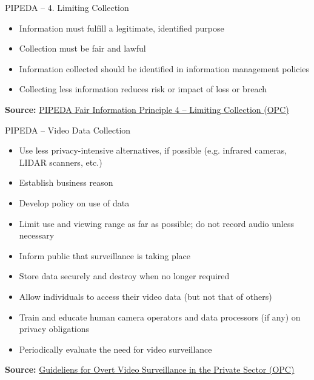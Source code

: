 \documentclass[ignorenonframetext,xcolor=x11names]{beamer}
\begin{document}
\begin{frame}{PIPEDA -- 4. Limiting Collection}
\begin{itemize}
   \item Information must fulfill a legitimate, identified purpose
   \item Collection must be fair and lawful
   \item Information collected should be identified in information management policies
   \item Collecting less information reduces risk or impact of loss or breach
\end{itemize}

\vspace{\baselineskip}
\scriptsize \textbf{Source:} \href{https://www.priv.gc.ca/en/privacy-topics/privacy-laws-in-canada/the-personal-information-protection-and-electronic-documents-act-pipeda/p_principle/principles/p_collection/}{PIPEDA Fair Information Principle 4 -- Limiting Collection (OPC)}
\end{frame}

\begin{frame}{PIPEDA -- Video Data Collection}
\begin{itemize}
   \item Use less privacy-intensive alternatives, if possible (e.g. infrared cameras, LIDAR scanners, etc.)
   \item Establish business reason
   \item Develop policy on use of data
   \item Limit use and viewing range as far as possible; do not record audio unless necessary
   \item Inform public that surveillance is taking place
   \item Store data securely and destroy when no longer required
   \item Allow individuals to access their video data (but not that of others)
   \item Train and educate human camera operators and data processors (if any) on privacy obligations
   \item Periodically evaluate the need for video surveillance
\end{itemize}

\vspace{\baselineskip}
\scriptsize \textbf{Source:} \href{https://www.priv.gc.ca/en/privacy-topics/surveillance/video-surveillance-by-businesses/gl_vs_080306/}{Guideliens for Overt Video Surveillance in the Private Sector (OPC)}
\end{frame}
\end{document}
